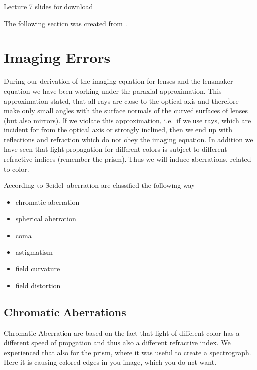 \documentclass[letterpaper,10pt,english]{sphinxmanual}
\begin{document}
Lecture 7 slides for download 

The following section was created from .


\section{Imaging Errors}
\label{\detokenize{notebooks/L7/Imaging Errors:Imaging-Errors}}\label{\detokenize{notebooks/L7/Imaging Errors::doc}}
During our derivation of the imaging equation for lenses and the lens\sphinxhyphen{}maker equation we have been working under the paraxial approximation. This approximation stated, that all rays are close to the optical axis and therefore make only small angles with the surface normals of the curved surfaces of lenses (but also mirrors). If we violate this approximation, i.e. if we use rays, which are incident for from the optical axis or strongly inclined, then we end up with reflections and refraction which
do not obey the imaging equation. In addition we have seen that light propagation for different colors is subject to different refractive indices (remember the prism). Thus we will induce aberrations, related to color.

According to Seidel, aberration are classified the following way
\begin{itemize}
\item {} 
chromatic aberration

\item {} 
spherical aberration

\item {} 
coma

\item {} 
astigmatism

\item {} 
field curvature

\item {} 
field distortion

\end{itemize}


\subsection{Chromatic Aberrations}
\label{\detokenize{notebooks/L7/Imaging Errors:Chromatic-Aberrations}}
Chromatic Aberration are based on the fact that light of different color has a different speed of propgation and thus also a different refractive index. We experienced that also for the prism, where it was useful to create a spectrograph. Here it is causing colored edges in you image, which you do not want.
\end{document}
